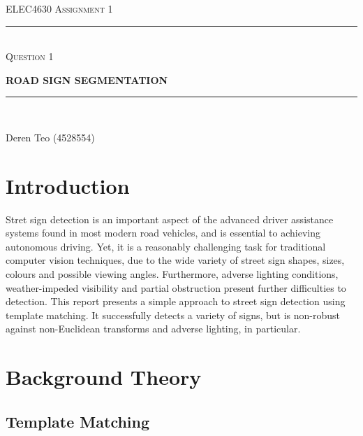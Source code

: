 \begin{titlepage}
    \centering

    \textsc{ELEC4630 Assignment 1}\\
    \vspace{9cm}

    \rule{\linewidth}{0.5pt}\\

    \vspace{1em}
    \LARGE\textsc{Question 1}\\
    \vspace{1em}

    \LARGE\uppercase{\textbf{{Road Sign Segmentation}}}\\

    \rule{\linewidth}{2pt}\\

    \vfill

    \normalsize{Deren Teo (4528554)}
    \vspace{1cm}

\end{titlepage}

\section{Introduction}

Stret sign detection is an important aspect of the advanced driver assistance systems found in most modern road vehicles, and is essential to achieving autonomous driving. Yet, it is a reasonably challenging task for traditional computer vision techniques, due to the wide variety of street sign shapes, sizes, colours and possible viewing angles. Furthermore, adverse lighting conditions, weather-impeded visibility and partial obstruction present further difficulties to detection. This report presents a simple approach to street sign detection using template matching. It successfully detects a variety of signs, but is non-robust against non-Euclidean transforms and adverse lighting, in particular.

\section{Background Theory}

\subsection{Template Matching}

